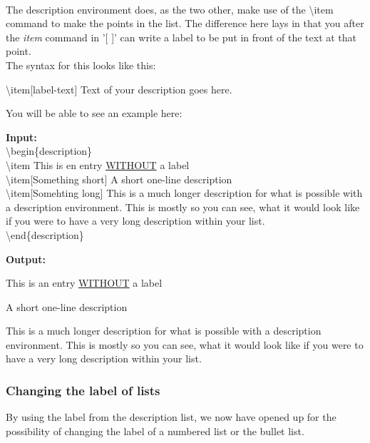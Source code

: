 \documentclass{article}
\newcommand{\bs}[1]{\textbackslash{}#1} %
\begin{document}
 \\
\indent The description environment does, as the two other, make use of the \bs{item}
command to make the points in the list. The difference here lays in that you after the 
\textit{item} command in '[ ]' can write a label to be put in front of the text at
that point. \\ 
The syntax for this looks like this:
\begin{center}
    \bs{item}[label-text] Text of your description goes here.
\end{center}

You will be able to see an example here:
\begin{multicols}{2}
    \begin{minipage}{\linewidth}
        \textbf{Input: } \\
        \bs{begin\{description\}} \\
            \bs{item} This is en entry \underline{WITHOUT} a label \\
            \bs{item}[Something short] A short one-line description\\
            \bs{item}[Somehting long] This is a much longer description for what is possible with a description environment. This is mostly so you can see, what it would look like if you were to have a very long description within your list. \\
        \bs{end}\{description\}
    \end{minipage}

    \begin{minipage}{\linewidth}
        \textbf{Output: } \\
        \begin{description}
            \item This is an entry \underline{WITHOUT} a label
            \item[Something short] A short one-line description
            \item[Something long] This is a much longer description for what is possible with a description environment. This is mostly so you can see, what it would look like if you were to have a very long description within your list.    
        \end{description}
    \end{minipage}
\end{multicols}

\subsubsection{Changing the label of lists}
By using the label from the description list, we now have opened up for the 
possibility of changing the label of a numbered list or the bullet list.
\end{document}
